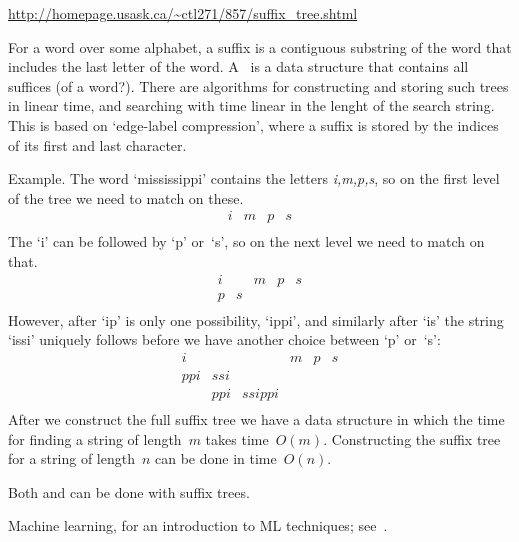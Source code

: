 \url{http://homepage.usask.ca/~ctl271/857/suffix_tree.shtml}

For a word over some alphabet, a suffix is a contiguous substring of
the word that includes the last letter of the
word. A~ is a data structure that contains all
suffices (of a word?). There are algorithms for constructing and
storing such trees in linear time, and searching with time linear in
the lenght of the search string. This is based on `edge-label
compression', where a suffix is stored by the indices of its first and
last character.

Example. The word `mississippi' contains the letters \emph{i,m,p,s},
so on the first level of the tree we need to match on these.
\[ 
\begin{array}{*{12}{c}}
i&m&p&s\\
\end{array}
\]
The `i' can be followed by `p' or~`s', so on the next level
we need to match on that.
\[ 
\begin{array}{*{12}{c}}
i& &m&p&s\\
p&s\\
\end{array}
\]
However, after `ip' is only one possibility, `ippi', 
and similarly after `is' the string `issi' uniquely
follows before we have another choice between `p' or~`s':
\[ 
\begin{array}{*{12}{c}}
i  &   &      &m&p&s\\
ppi&ssi\\
   &ppi&ssippi\\
\end{array}
\]
After we construct the full suffix tree we have a data structure
in which the time for finding a string of length~$m$ takes
time~$O(m)$.
Constructing the suffix tree for a string of length~$n$ 
can be done in time~$O(n)$.

Both 
 and  can
be done with suffix trees.

\begin{notready}
Machine learning, for an introduction to ML techniques; see~\cite{Tara:MLbiology}.
\end{notready}
